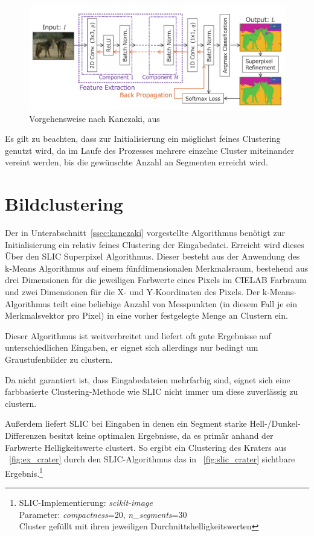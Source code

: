 \begin{figure}[h!]
	\centering
	\includegraphics[width=.8\textwidth,keepaspectratio]{images/Kan18_01.png}
	\caption{Vorgehensweise nach Kanezaki, aus \cite{kanezaki_18}}
	\label{fig:Kan18_01}
\end{figure}

Es gilt zu beachten, dass zur Initialisierung ein möglichst feines Clustering genutzt wird, da im Laufe des Prozesses mehrere einzelne Cluster miteinander vereint werden, bis die gewünschte Anzahl an Segmenten erreicht wird.

\section{Bildclustering}
\label{ssec:clustering}

Der in Unterabschnitt~\ref{ssec:kanezaki} vorgestellte Algorithmus benötigt zur Initialisierung ein relativ feines Clustering der Eingabedatei. Erreicht wird dieses Über den SLIC Superpixel Algorithmus. Dieser besteht aus der Anwendung des k-Means Algorithmus auf einem fünfdimensionalen Merkmalsraum, bestehend aus drei Dimensionen für die jeweiligen Farbwerte eines Pixels im CIELAB Farbraum und zwei Dimensionen für die X- und Y-Koordinaten des Pixels. \cite{achanta_10} Der k-Means-Algorithmus teilt eine beliebige Anzahl von Messpunkten (in diesem Fall je ein Merkmalsvektor pro Pixel) in eine vorher festgelegte Menge an Clustern ein.

Dieser Algorithmus ist weitverbreitet und liefert oft gute Ergebnisse auf unterschiedlichen Eingaben, er eignet sich allerdings nur bedingt um Graustufenbilder zu clustern.

Da nicht garantiert ist, dass Eingabedateien mehrfarbig sind, eignet sich eine farbbasierte Clustering-Methode wie SLIC nicht immer um diese zuverlässig zu clustern. 

Außerdem liefert SLIC bei Eingaben in denen ein Segment starke Hell-/Dunkel-Differenzen besitzt keine optimalen Ergebnisse, da es primär anhand der Farbwerte \bzw Helligkeitswerte clustert. So ergibt ein Clustering des Kraters aus \figurename~\ref{fig:ex_crater} durch den SLIC-Algorithmus \cite{achanta_10} das in \figurename~\ref{fig:slic_crater} sichtbare Ergebnis.\footnote{SLIC-Implementierung: \textit{scikit-image}\\Parameter: \textit{compactness}=20, \textit{n\_segments}=30\\Cluster gefüllt mit ihren jeweiligen Durchnittshelligkeitswerten}


